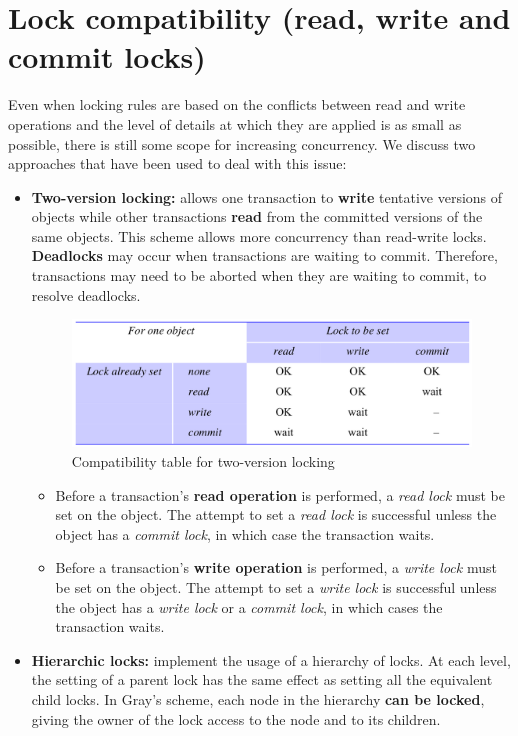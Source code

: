 \section{Lock compatibility (read, write and commit locks)}
Even when locking rules are based on the conflicts between read and write operations and the level of details at which they are applied is as small as possible, there is still some scope for increasing concurrency. We discuss two approaches that have been used to deal with this issue:
\begin{itemize}
    \item \textbf{Two-version locking:} allows one transaction to \textbf{write} tentative versions of objects while other transactions \textbf{read} from the committed versions of the same objects. This scheme allows more concurrency than read-write locks. \textbf{Deadlocks} may occur when transactions are waiting to commit. Therefore, transactions may need to be aborted when they are waiting to commit, to resolve deadlocks.
    
    \begin{figure}[!h]
    \centering
    \includegraphics[width=.80\linewidth]{images/TransactionAndConcurrencyControl/lockCompatibilityRead.png}
    \caption{Compatibility table for two-version locking}
\end{figure}
    
    \begin{itemize}
        \item Before a transaction’s \textbf{read operation} is performed, a \textit{read lock} must be set on the object. The attempt to set a \textit{read lock} is successful unless the object has a \textit{commit lock}, in which case the transaction waits.
        \item  Before a transaction’s \textbf{write operation} is performed, a \textit{write lock} must be set on the object. The attempt to set a \textit{write lock} is successful unless the object has a \textit{write lock} or a \textit{commit lock}, in which cases the transaction waits.
    \end{itemize}
    
    \item \textbf{Hierarchic locks:} implement the usage of a hierarchy of locks. At each level, the setting of a parent lock has the same effect as setting all the equivalent child locks. In Gray’s scheme, each node in the hierarchy \textbf{can be locked}, giving the owner of the lock access to the node and to its children.
    

\end{itemize}

